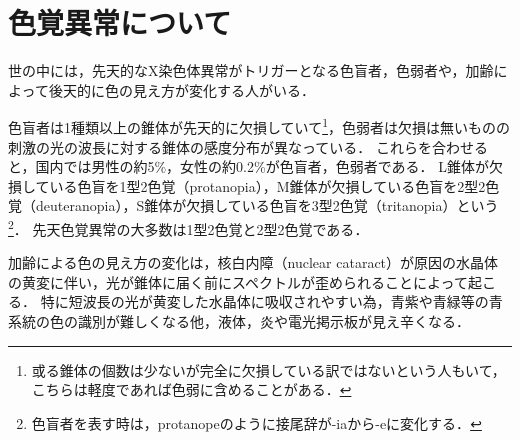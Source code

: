 \documentclass[uplatex,paper=a4,fontsize=4.0truemm,jafontsize=4.0truemm,head_space=30.0truemm,foot_space=30.0truemm,baselineskip=8.0truemm,line_length=40zw,gutter=25.0truemm,oneside,openany,fleqn,hanging_panctuation,open_bracket_pos=nibu_tentsuki,dvipdfmx,jis2004,book,titlepage]{jlreq}
\theoremstyle{mystyle}
\begin{document}
		\section{色覚異常について}
			世の中には，先天的なX染色体異常がトリガーとなる色盲者\cite{Okabe2002a}，色弱者\cite{Sunaga2017}や，加齢によって後天的に色の見え方が変化する人\cite{Kuriki2000}がいる．

			色盲者は1種類以上の錐体が先天的に欠損していて\footnote{或る錐体の個数は少ないが完全に欠損している訳ではないという人もいて，こちらは軽度であれば色弱に含めることがある．}，色弱者は欠損は無いものの刺激の光の波長に対する錐体の感度分布が異なっている．
			これらを合わせると，国内では男性の約5\%，女性の約0.2\%が色盲者，色弱者である\cite[p.~1]{Okabe2002a}．
			L錐体が欠損している色盲を1型2色覚（protanopia），M錐体が欠損している色盲を2型2色覚（deuteranopia），S錐体が欠損している色盲を3型2色覚（tritanopia）という\footnote{色盲者を表す時は，protanopeのように接尾辞が-iaから-eに変化する．}．
			先天色覚異常の大多数は1型2色覚と2型2色覚である\cite[p.~9]{doctors2014}．

			加齢による色の見え方の変化は，核白内障（nuclear cataract）が原因の水晶体の黄変に伴い，光が錐体に届く前にスペクトルが歪められることによって起こる．
			特に短波長の光が黄変した水晶体に吸収されやすい為，青紫や青緑等の青系統の色の識別が難しくなる他，液体，炎や電光掲示板が見え辛くなる\cite{Ishihara1998}．
\end{document}
